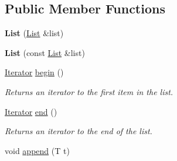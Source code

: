 \subsection*{Public Member Functions}
\begin{DoxyCompactItemize}
\item 
\hypertarget{classetk_1_1_list_a23f9b0efe027159f914214d126b486b3}{{\bfseries List} (\hyperlink{classetk_1_1_list}{List} \&list)}\label{classetk_1_1_list_a23f9b0efe027159f914214d126b486b3}

\item 
\hypertarget{classetk_1_1_list_ac85e0e37f248ba1b52f410cd00c8c304}{{\bfseries List} (const \hyperlink{classetk_1_1_list}{List} \&list)}\label{classetk_1_1_list_ac85e0e37f248ba1b52f410cd00c8c304}

\item 
\hypertarget{classetk_1_1_list_afb70c4551d2e9ebc6b4bb04337d081e6}{\hyperlink{classetk_1_1_list_1_1_iterator}{Iterator} \hyperlink{classetk_1_1_list_afb70c4551d2e9ebc6b4bb04337d081e6}{begin} ()}\label{classetk_1_1_list_afb70c4551d2e9ebc6b4bb04337d081e6}

\begin{DoxyCompactList}\small\item\em Returns an iterator to the first item in the list. \end{DoxyCompactList}\item 
\hypertarget{classetk_1_1_list_a19b25cd89872debc07cc002c18845578}{\hyperlink{classetk_1_1_list_1_1_iterator}{Iterator} \hyperlink{classetk_1_1_list_a19b25cd89872debc07cc002c18845578}{end} ()}\label{classetk_1_1_list_a19b25cd89872debc07cc002c18845578}

\begin{DoxyCompactList}\small\item\em Returns an iterator to the end of the list. \end{DoxyCompactList}\item 
\hypertarget{classetk_1_1_list_a45df48bc3bb87c2dd26e56f51115ab27}{void \hyperlink{classetk_1_1_list_a45df48bc3bb87c2dd26e56f51115ab27}{append} (T t)}\label{classetk_1_1_list_a45df48bc3bb87c2dd26e56f51115ab27}


\end{DoxyCompactItemize}
